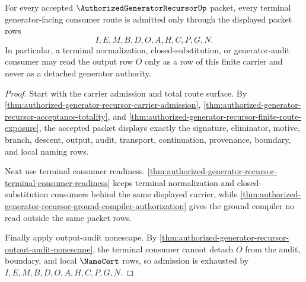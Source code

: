\begin{theorem}
\label{thm:authorized-generator-recursor-terminal-generator-admission}
For every accepted $\AuthorizedGeneratorRecursorUp$ packet, every terminal generator-facing consumer route is admitted only through the displayed packet rows
$$
I,E,M,B,D,O,A,H,C,P,G,N.
$$
In particular, a terminal normalization, closed-substitution, or generator-audit consumer may read the output row $O$ only as a row of this finite carrier and never as a detached generator authority.
\end{theorem}
\begin{proof}
Start with the carrier admission and total route surface. By \autoref{thm:authorized-generator-recursor-carrier-admission}, \autoref{thm:authorized-generator-recursor-acceptance-totality}, and \autoref{thm:authorized-generator-recursor-finite-route-exposure}, the accepted packet displays exactly the signature, eliminator, motive, branch, descent, output, audit, transport, continuation, provenance, boundary, and local naming rows.

Next use terminal consumer readiness. \autoref{thm:authorized-generator-recursor-terminal-consumer-readiness} keeps terminal normalization and closed-substitution consumers behind the same displayed carrier, while \autoref{thm:authorized-generator-recursor-ground-compiler-authorization} gives the ground compiler no read outside the same packet rows.

Finally apply output-audit nonescape. By \autoref{thm:authorized-generator-recursor-output-audit-nonescape}, the terminal consumer cannot detach $O$ from the audit, boundary, and local $\NameCert$ rows, so admission is exhausted by $I,E,M,B,D,O,A,H,C,P,G,N$.
\end{proof}

